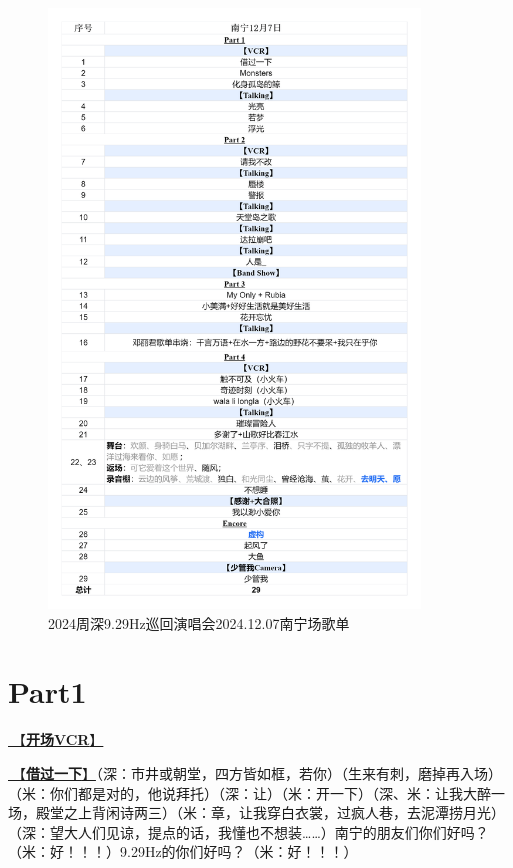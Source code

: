 \documentclass[]{ctexbook}
\begin{document}
\begin{figure}

{\centering \includegraphics[width=280pt]{img/playlists/playlists-nanning-20241207} 

}

\caption{2024周深9.29Hz巡回演唱会2024.12.07南宁场歌单}\label{fig:unnamed-chunk-160}
\end{figure}

\newpage

\section{Part1}\label{nanning-20241207-part1}

\hyperref[opening-vcr]{🎥【\textbf{开场VCR}】}

\hyperref[I-will-go-my-way]{🎵【\textbf{借过一下}】}（深：市井或朝堂，四方皆如框，若你）（生来有刺，磨掉再入场）（米：你们都是对的，他说拜托）（深：让）（米：开一下）（深、米：让我大醉一场，殿堂之上背闲诗两三）（米：章，让我穿白衣裳，过疯人巷，去泥潭捞月光）（深：望大人们见谅，提点的话，我懂也不想装\ldots\ldots）南宁的朋友们你们好吗？（米：好！！！）9.29Hz的你们好吗？（米：好！！！）
\end{document}
